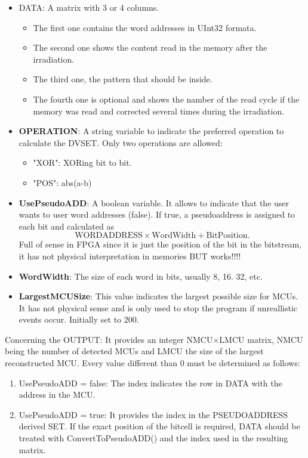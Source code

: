 \begin{itemize}
	 \begin{itemize}
	 	\item DATA: A matrix with 3 or 4 columns. 
	 		\begin{itemize}
	 			\item  The first one contains the word addresses in UInt32 formata.
	 			\item        The second one shows the content read in the memory after the irradiation.
	 			\item        The third one, the pattern that should be inside.
	 			\item        The fourth one is optional and shows the namber of the read cycle if the  memory was read and corrected several times during the irradiation.
	 		\end{itemize}
	 	\item \textbf{OPERATION}: A string variable to indicate the preferred operation to calculate
	 	the DVSET. Only two operations are allowed: 
	 	\begin{itemize}
	 		\item "XOR": XORing bit to bit.
	 		\item "POS": abs(a-b)
	 	\end{itemize}
	 	\item \textbf{UsePseudoADD}: A boolean variable. It allows to indicate that the user wants to user
	 	word addresses (false). If true, a pseudoaddress is assigned to each bit and calculated
	 	as \[\text{WORDADDRESS}\times\text{WordWidth} + \text{BitPosition.}\] Full of sense in FPGA since it is just the position
	 	of the bit in the bitstream, it has not physical interpretation in memories BUT works!!!!
	 	\item \textbf{WordWidth}: The size of each word in bits, usually 8, 16. 32, etc.
	 	\item \textbf{LargestMCUSize}: This value indicates the largest possible size for MCUs. It has not physical sense
	 	and is only used to stop the program if unreallistic events occur. Initially set to 200.
	 \end{itemize}
  
	 Concerning the OUTPUT: It provides an integer NMCU\(\times\)LMCU matrix, NMCU being the number of detected MCUs and
	 LMCU the size of the largest reconstructed MCU. Every value different than 0 must be determined as follows:
	 \begin{enumerate}
	 	\item UsePseudoADD = false: The index indicates the row in DATA with the address in the MCU.
	 	\item UsePseudoADD = true: It provides the index in the PSEUDOADDRESS derived SET. If the exact position of
	 	the bitcell is required, DATA should be treated with ConvertToPseudoADD() and
	 	the index used in the resulting matrix.
	 \end{enumerate}
 

\end{itemize}
